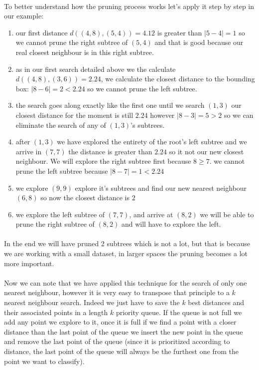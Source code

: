 \documentclass[11 pt]{article}
\begin{document}
\paragraph{}To better understand how the pruning process works let's apply it step by step in our example:\\
\begin{enumerate}
  \item our first distance $d((4,8),(5,4)) = 4.12$ is greater than $|5-4|=1$ so we cannot prune the right subtree of $(5,4)$ and that is good because our real closest neighbour is in this right subtree.
  \item as in our first search detailed above we the calculate $d((4,8),(3,6))=2.24$, we calculate the closest distance to the bounding box: $|8-6|=2<2.24$ so we cannot prune the left subtree.
  \item the search goes along exactly like the first one until we search $(1,3)$ our closest distance for the moment is still $2.24$ however $|8-3|=5>2$ so we can eliminate the search of any of $(1,3)$'s subtrees.
  \item after $(1,3)$ we have explored the entirety of the root's left subtree and we arrive in $(7,7)$ the distance is greater than $2.24$ so it not our new closest neighbour. We will explore the right subtree first because $8\geq7$. we cannot prune the left subtree because $|8-7|=1<2.24$
  \item we explore $(9,9)$ explore it's subtrees and find our new nearest neighbour $(6,8)$ so now the closest distance is $2$
  \item we explore the left subtree of $(7,7)$, and arrive at $(8,2)$ we will be able to prune the right subtree of $(8,2)$ and will have to explore the left.
\end{enumerate}
\paragraph{}In the end we will have pruned 2 subtrees which is not a lot, but that is because we are working with a small dataset, in larger spaces the pruning becomes a lot more important.
\paragraph{}Now we can note that we have applied this technique for the search of only one nearest neighbour, however it is very easy to transpose that principle to a $k$ nearest neighbour search. Indeed we just have to save the $k$ best distances and their associated points in a length $k$ priority queue. If the queue is not full we add any point we explore to it, once it is full if we find a point with a closer distance than the last point of the queue we insert the new point in the queue and remove the last point of the queue (since it is prioritized according to distance, the last point of the queue will always be the furthest one from the point we want to classify).
\end{document}
